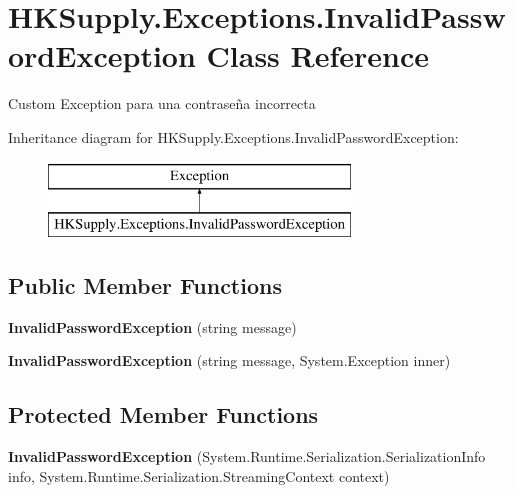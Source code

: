 \hypertarget{class_h_k_supply_1_1_exceptions_1_1_invalid_password_exception}{}\section{H\+K\+Supply.\+Exceptions.\+Invalid\+Password\+Exception Class Reference}
\label{class_h_k_supply_1_1_exceptions_1_1_invalid_password_exception}


Custom Exception para una contraseña incorrecta  


Inheritance diagram for H\+K\+Supply.\+Exceptions.\+Invalid\+Password\+Exception\+:\begin{figure}[H]
\begin{center}
\leavevmode
\includegraphics[height=2.000000cm]{class_h_k_supply_1_1_exceptions_1_1_invalid_password_exception}
\end{center}
\end{figure}
\subsection*{Public Member Functions}
\begin{DoxyCompactItemize}
\item 
\mbox{\label{class_h_k_supply_1_1_exceptions_1_1_invalid_password_exception_aa25a42b91b39d8b234196368cc92f1be}} 
{\bfseries Invalid\+Password\+Exception} (string message)
\item 
\mbox{\label{class_h_k_supply_1_1_exceptions_1_1_invalid_password_exception_a5179c29723f14deef7f1d26eea1e7f3f}} 
{\bfseries Invalid\+Password\+Exception} (string message, System.\+Exception inner)
\end{DoxyCompactItemize}
\subsection*{Protected Member Functions}
\begin{DoxyCompactItemize}
\item 
\mbox{\label{class_h_k_supply_1_1_exceptions_1_1_invalid_password_exception_a017a6b8ebe5e4db12eee08b0feb75edc}} 
{\bfseries Invalid\+Password\+Exception} (System.\+Runtime.\+Serialization.\+Serialization\+Info info, System.\+Runtime.\+Serialization.\+Streaming\+Context context)
\end{DoxyCompactItemize}


